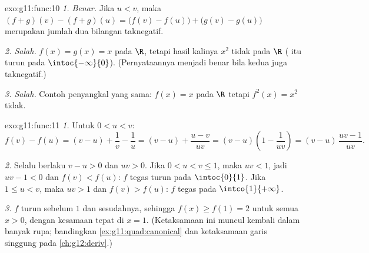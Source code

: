 \begin{solution}{exo:g11:func:10}
\emph{1. Benar.} Jika $u < v$, maka
$(f+g)(v) - (f+g)(u) = \bigl(f(v)-f(u)\bigr) + \bigl(g(v)-g(u)\bigr)$
merupakan jumlah dua bilangan taknegatif.

\emph{2. Salah.} $f(x) = g(x) = x$  pada $\R$, tetapi hasil
kalinya $x^2$ tidak  pada $\R$ ( itu turun pada
$\intoc{-\infty}{0}$). (Pernyataannya menjadi benar bila kedua 
juga taknegatif.)

\emph{3. Salah.} Contoh penyangkal yang sama: $f(x) = x$  pada $\R$
tetapi $f^2(x) = x^2$ tidak.
\end{solution}

\begin{solution}{exo:g11:func:11}
\emph{1.} Untuk $0 < u < v$:
\[
f(v) - f(u) = (v - u) + \frac1v - \frac1u
= (v - u) + \frac{u - v}{uv}
= (v - u)\left(1 - \frac{1}{uv}\right)
= (v - u)\,\frac{uv - 1}{uv}.
\]

\emph{2.} Selalu berlaku $v - u > 0$ dan $uv > 0$. Jika $0 < u < v \leq 1$,
maka $uv < 1$, jadi $uv - 1 < 0$ dan $f(v) < f(u)$: $f$ tegas turun
pada $\intoc{0}{1}$. Jika $1 \leq u < v$, maka $uv > 1$ dan $f(v) > f(u)$:
$f$ tegas  pada $\intco{1}{+\infty}$.

\emph{3.} $f$ turun sebelum $1$ dan  sesudahnya, sehingga
$f(x) \geq f(1) = 2$ untuk semua $x > 0$, dengan kesamaan tepat di $x = 1$.
(Ketaksamaan ini muncul kembali dalam banyak rupa; bandingkan
\cref{ex:g11:quad:canonical} dan ketaksamaan garis singgung pada
\cref{ch:g12:deriv}.)
\end{solution}

